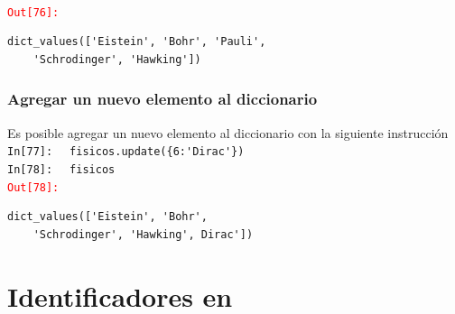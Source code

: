 {\begin{frame}[fragile]
\\
\pause
\textcolor{red}{\texttt{Out[76]: }}
\begingroup
\fontsize{12}{12}\selectfont
\begin{lstlisting}
dict_values(['Eistein', 'Bohr', 'Pauli',
	'Schrodinger', 'Hawking'])
\end{lstlisting}
\endgroup
\end{frame}
\begin{frame}[fragile]
\frametitle{Agregar un nuevo elemento al diccionario}
Es posible agregar un nuevo elemento al diccionario con la siguiente instrucción
\\
\bigskip
\textcolor{ao}{\texttt{In[77]: }} \verb| fisicos.update({6:'Dirac'})|
\\
\pause
\bigskip
\textcolor{ao}{\texttt{In[78]: }} \verb| fisicos|
\\
\pause
\textcolor{red}{\texttt{Out[78]: }}
\\
\begin{lstlisting}
dict_values(['Eistein', 'Bohr', 
	'Schrodinger', 'Hawking', Dirac'])
\end{lstlisting}
\end{frame}
\section{Identificadores en \python}
}
